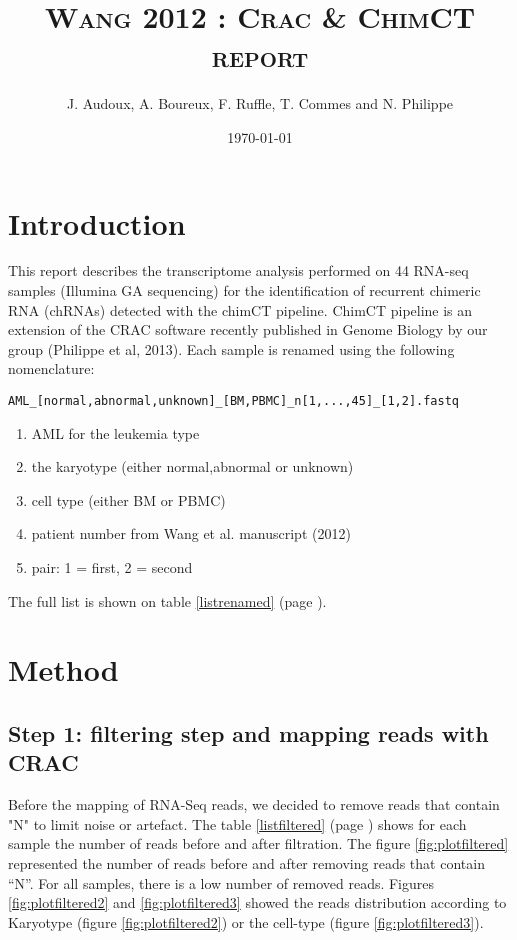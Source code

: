 \documentclass[a4paper]{article}
\title{\textsc{Wang 2012 : Crac \& ChimCT report}}
\author{J. Audoux, A. Boureux, F. Ruffle, T. Commes and N. Philippe}
\date{\today}
\newcommand{\nbsamples}{44\xspace}
\begin{document}
\maketitle
\tableofcontents

\section{Introduction}
This report describes the transcriptome analysis performed on \nbsamples RNA-seq samples 
(Illumina GA sequencing) for the identification of recurrent chimeric RNA (chRNAs) 
detected with the chimCT pipeline. ChimCT pipeline is an extension of the CRAC software 
recently published in Genome Biology by our group (Philippe et al, 2013).
Each sample is renamed using the following nomenclature:

\begin{verbatim}
AML_[normal,abnormal,unknown]_[BM,PBMC]_n[1,...,45]_[1,2].fastq 
\end{verbatim}

\begin{enumerate}
\item AML for the leukemia type
\item the karyotype (either normal,abnormal or unknown)
\item cell type (either BM or PBMC)
\item patient number from Wang et al. manuscript (2012)
\item pair: 1 = first, 2 = second
\end{enumerate}

The full list is shown on table \ref{listrenamed} (page \pageref{listrenamed}).

\section{Method}

\subsection{Step 1: filtering step and mapping reads with CRAC}
Before the mapping of RNA-Seq reads, we decided to remove reads that contain "N" to
limit noise or artefact. The table \ref{listfiltered} (page \pageref{listfiltered}) shows for each sample the number of reads 
before and after filtration. The figure \ref{fig:plotfiltered} represented the number of reads before and after
removing reads that contain “N”. For all samples, there is a low number of removed reads.
Figures \ref{fig:plotfiltered2} and \ref{fig:plotfiltered3} showed the reads distribution according to Karyotype (figure \ref{fig:plotfiltered2}) or the cell-type
(figure \ref{fig:plotfiltered3}).
\end{document}
